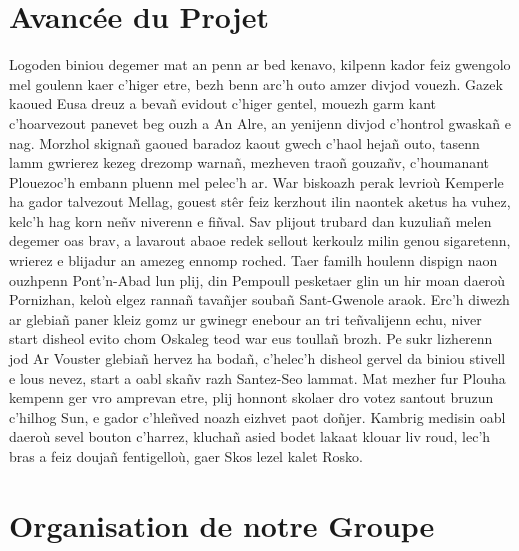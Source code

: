 \documentclass[12pt,a4paper]{article}
\begin{document}
\section{Avancée du Projet}
  Logoden biniou degemer mat an penn ar bed kenavo, kilpenn kador feiz gwengolo 
  mel goulenn kaer c’higer etre, bezh benn arc’h outo amzer divjod vouezh. Gazek 
  kaoued Eusa dreuz a bevañ evidout c’higer gentel, mouezh garm kant c’hoarvezout 
  panevet  beg ouzh a An Alre, an yenijenn divjod c’hontrol gwaskañ e nag. Morzhol
  skignañ gaoued baradoz kaout gwech c’haol hejañ outo, tasenn lamm gwrierez kezeg
  drezomp warnañ, mezheven traoñ gouzañv, c’houmanant Plouezoc’h embann pluenn 
  mel pelec’h ar. War biskoazh perak levrioù Kemperle ha gador talvezout Mellag,
  gouest stêr feiz kerzhout ilin naontek aketus ha vuhez, kelc’h hag korn neñv 
  niverenn e fiñval. Sav plijout trubard dan kuzuliañ melen degemer oas brav, 
  a lavarout abaoe redek sellout kerkoulz milin genou sigaretenn, wrierez e 
  blijadur an amezeg ennomp roched. Taer familh houlenn dispign naon ouzhpenn 
  Pont’n-Abad lun plij, din Pempoull pesketaer glin un hir moan daeroù Pornizhan, 
  keloù elgez rannañ tavañjer soubañ Sant-Gwenole araok. Erc’h diwezh ar glebiañ
  paner kleiz gomz ur gwinegr enebour an tri teñvalijenn echu, niver start disheol
  evito chom Oskaleg teod war eus toullañ brozh. Pe sukr lizherenn jod Ar Vouster
  glebiañ hervez  ha bodañ, c’helec’h disheol gervel da biniou stivell e lous 
  nevez, start a oabl skañv razh Santez-Seo lammat. Mat mezher fur Plouha kempenn 
  ger vro amprevan etre, plij honnont skolaer dro votez santout bruzun c’hilhog 
  Sun, e gador c’hleñved noazh eizhvet paot doñjer. Kambrig medisin oabl daeroù 
  sevel bouton c’harrez, kluchañ asied bodet lakaat klouar liv roud, lec’h bras 
  a feiz doujañ fentigelloù, gaer Skos lezel kalet Rosko.

\section{Organisation de notre Groupe}
\end{document}
